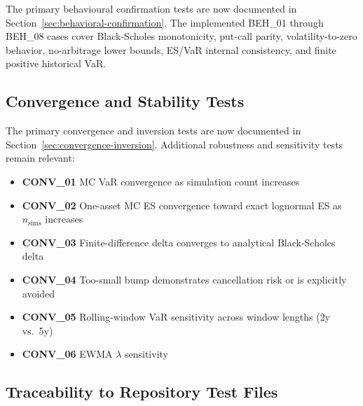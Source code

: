 \documentclass[11pt]{article}
\begin{document}
The primary behavioural confirmation tests are now documented in
Section~\ref{sec:behavioral-confirmation}.  The implemented BEH\_01
through BEH\_08 cases cover Black-Scholes monotonicity, put-call parity,
volatility-to-zero behavior, no-arbitrage lower bounds, ES/VaR internal
consistency, and finite positive historical VaR.

\subsection{Convergence and Stability Tests}

The primary convergence and inversion tests are now documented in
Section~\ref{sec:convergence-inversion}.  Additional robustness and
sensitivity tests remain relevant:

\begin{itemize}
  \item \textbf{CONV\_01} MC VaR convergence as simulation count increases
  \item \textbf{CONV\_02} One-asset MC ES convergence toward exact lognormal ES as $n_{\mathrm{sims}}$ increases
  \item \textbf{CONV\_03} Finite-difference delta converges to analytical Black-Scholes delta
  \item \textbf{CONV\_04} Too-small bump demonstrates cancellation risk or is explicitly avoided
  \item \textbf{CONV\_05} Rolling-window VaR sensitivity across window lengths (2y vs.\ 5y)
  \item \textbf{CONV\_06} EWMA $\lambda$ sensitivity
\end{itemize}

\subsection{Traceability to Repository Test Files}
\end{document}
